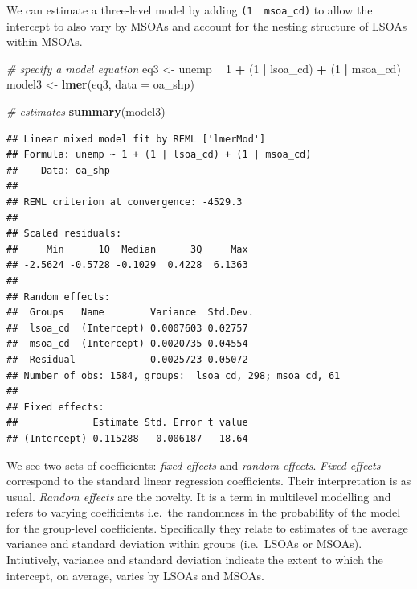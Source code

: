 \documentclass[]{book}
\newenvironment{Shaded}{\begin{snugshade}}{\end{snugshade}}
\newcommand{\KeywordTok}[1]{\textcolor[rgb]{0.13,0.29,0.53}{\textbf{#1}}}
\newcommand{\DataTypeTok}[1]{\textcolor[rgb]{0.13,0.29,0.53}{#1}}
\newcommand{\DecValTok}[1]{\textcolor[rgb]{0.00,0.00,0.81}{#1}}
\newcommand{\StringTok}[1]{\textcolor[rgb]{0.31,0.60,0.02}{#1}}
\newcommand{\CommentTok}[1]{\textcolor[rgb]{0.56,0.35,0.01}{\textit{#1}}}
\newcommand{\OperatorTok}[1]{\textcolor[rgb]{0.81,0.36,0.00}{\textbf{#1}}}
\newcommand{\NormalTok}[1]{#1}
\begin{document}
We can estimate a three-level model by adding
\texttt{(1\ \textbar{}\ msoa\_cd)} to allow the intercept to also vary
by MSOAs and account for the nesting structure of LSOAs within MSOAs.

\begin{Shaded}
\begin{Highlighting}[]
\CommentTok{# specify a model equation}
\NormalTok{eq3 <-}\StringTok{ }\NormalTok{unemp }\OperatorTok{~}\StringTok{ }\DecValTok{1} \OperatorTok{+}\StringTok{ }\NormalTok{(}\DecValTok{1} \OperatorTok{|}\StringTok{ }\NormalTok{lsoa_cd) }\OperatorTok{+}\StringTok{ }\NormalTok{(}\DecValTok{1} \OperatorTok{|}\StringTok{ }\NormalTok{msoa_cd)}
\NormalTok{model3 <-}\StringTok{ }\KeywordTok{lmer}\NormalTok{(eq3, }\DataTypeTok{data =}\NormalTok{ oa_shp)}

\CommentTok{# estimates}
\KeywordTok{summary}\NormalTok{(model3)}
\end{Highlighting}
\end{Shaded}

\begin{verbatim}
## Linear mixed model fit by REML ['lmerMod']
## Formula: unemp ~ 1 + (1 | lsoa_cd) + (1 | msoa_cd)
##    Data: oa_shp
## 
## REML criterion at convergence: -4529.3
## 
## Scaled residuals: 
##     Min      1Q  Median      3Q     Max 
## -2.5624 -0.5728 -0.1029  0.4228  6.1363 
## 
## Random effects:
##  Groups   Name        Variance  Std.Dev.
##  lsoa_cd  (Intercept) 0.0007603 0.02757 
##  msoa_cd  (Intercept) 0.0020735 0.04554 
##  Residual             0.0025723 0.05072 
## Number of obs: 1584, groups:  lsoa_cd, 298; msoa_cd, 61
## 
## Fixed effects:
##             Estimate Std. Error t value
## (Intercept) 0.115288   0.006187   18.64
\end{verbatim}

We see two sets of coefficients: \emph{fixed effects} and \emph{random
effects}. \emph{Fixed effects} correspond to the standard linear
regression coefficients. Their interpretation is as usual. \emph{Random
effects} are the novelty. It is a term in multilevel modelling and
refers to varying coefficients i.e.~the randomness in the probability of
the model for the group-level coefficients. Specifically they relate to
estimates of the average variance and standard deviation within groups
(i.e.~LSOAs or MSOAs). Intiutively, variance and standard deviation
indicate the extent to which the intercept, on average, varies by LSOAs
and MSOAs.
\end{document}
